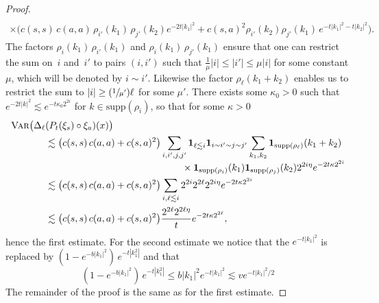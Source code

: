 \documentclass[JEP,XML,SOM,Unicode,published]{cedram}
\newcommand{\Psfrac}[2]{(\sfrac{#1}{#2})}
\theoremstyle{definition}
\newcommand{\bfone}{\mathbf{1}}
\begin{document}
\begin{proof}
\begin{multline*}
\\
\times\bigl( c(s,s) \, c(a,a) \, \rho_{i'}(k_1) \, \rho_{j'}(k_2)e^{-2t|k_1|^2} + c(s,a)^2\rho_{i'}(k_2)\rho_{j'}(k_1) \, e^{-t|k_1|^2-t|k_2|^2} \bigr).
\end{multline*}
The factors $ \rho_i(k_1)\,\rho_{i'}(k_1)$ and $\rho_i(k_1)\,\rho_{j'}(k_1) $ ensure that one can restrict the sum on~$i$ and~$i'$ to pairs $(i,i')$ such that $\frac{1}{\mu}|i|\leq |i'| \leq \mu |i|$ for some constant $\mu$, which will be denoted by $i\sim i'$. Likewise the factor $\rho_\ell(k_1+k_2)$ enables us to restrict the sum to $|i|\geq \Psfrac{1}{\mu'}\ell$ for some $\mu'$. There exists some $\kappa_0>0$ such that $e^{-2t|k|^2}\lesssim e^{-t\kappa_0 2^{2i}}$ for $k\in\text{supp}(\rho_i)$, so that for some $\kappa>0$
\begin{align*}
\textsc{{Var}}\bigl(\Delta_\ell&(P_t(\xi_s)\circ\xi_a)(x)\bigr)
\\
&\lesssim \bigl(c(s,s)\,c(a,a) + c(s,a)^2\bigr) \sum_{i,i',j,j'} \bfone_{\ell\lesssim i}\bfone_{i\sim i' \sim j \sim j'} \sum_{k_1,k_2} \bfone_{\text{supp}(\rho_\ell)}(k_1+k_2) \\[-3pt]
&\hspace*{5cm} \times \bfone_{\text{supp}(\rho_i)}(k_1)\bfone_{\text{supp}(\rho_j)}(k_2)2^{2i\eta} e^{-2t\kappa 2^{2i}}
\\
&\lesssim \bigl(c(s,s)\,c(a,a) + c(s,a)^2\bigr) \sum_{i, \ell\lesssim i}2^{2i}2^{2\ell}2^{2i\eta}e^{-2t\kappa 2^{2i}} \
\\
&\lesssim \bigl(c(s,s) \, c(a,a) + c(s,a)^2\bigr) \frac{2^{2\ell}2^{2\ell\eta}}{t}e^{-2t\kappa 2^{2\ell}},
\end{align*}
hence the first estimate. For the second estimate we notice that the $e^{-t|k_1|^2}$ is replaced by $(1-e^{-b|k_1|^2})\,e^{-t|k_1^2|}$ and that
\[
(1-e^{-b|k_1|^2}) \, e^{-t|k_1^2|}\leq b|k_1|^2 e^{-t|k_1|^2} \lesssim v e^{-t |k_1|^2/2}
\]
The remainder of the proof is the same as for the first estimate.
\end{proof}
\end{document}
